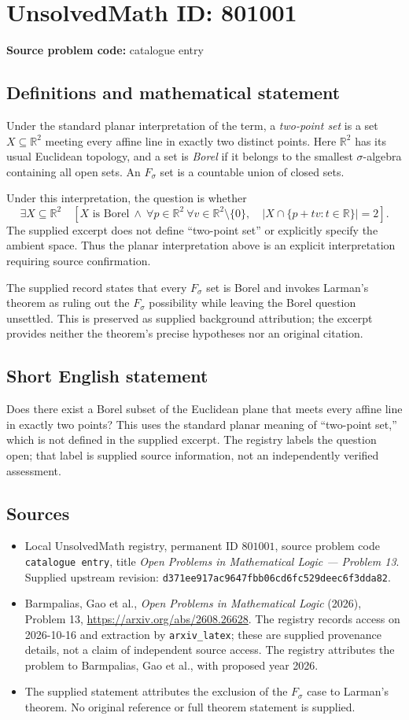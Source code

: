 \documentclass[11pt]{article}
\newcommand{\R}{\mathbb{R}}
\begin{document}
\section*{UnsolvedMath ID: 801001}
\textbf{Source problem code:} catalogue entry
\subsection{Definitions and mathematical statement}
Under the standard planar interpretation of the term, a \emph{two-point set} is a set \(X\subseteq\R^2\) meeting every affine line in exactly two distinct points. Here \(\R^2\) has its usual Euclidean topology, and a set is \emph{Borel} if it belongs to the smallest \(\sigma\)-algebra containing all open sets. An \(F_\sigma\) set is a countable union of closed sets.

Under this interpretation, the question is whether
\[
\exists X\subseteq\R^2\quad\left[X\text{ is Borel}\ \land\ \forall p\in\R^2\ \forall v\in\R^2\setminus\{0\},\quad \left|X\cap\{p+tv:t\in\R\}\right|=2\right].
\]
The supplied excerpt does not define ``two-point set'' or explicitly specify the ambient space. Thus the planar interpretation above is an explicit interpretation requiring source confirmation.

The supplied record states that every \(F_\sigma\) set is Borel and invokes Larman's theorem as ruling out the \(F_\sigma\) possibility while leaving the Borel question unsettled. This is preserved as supplied background attribution; the excerpt provides neither the theorem's precise hypotheses nor an original citation.
\subsection{Short English statement}
Does there exist a Borel subset of the Euclidean plane that meets every affine line in exactly two points? This uses the standard planar meaning of ``two-point set,'' which is not defined in the supplied excerpt. The registry labels the question open; that label is supplied source information, not an independently verified assessment.
\subsection{Sources}
\begin{itemize}
\item Local UnsolvedMath registry, permanent ID \(801001\), source problem code \texttt{catalogue entry}, title \emph{Open Problems in Mathematical Logic --- Problem 13}. Supplied upstream revision: \texttt{d371ee917ac9647fbb06cd6fc529deec6f3dda82}.
\item Barmpalias, Gao et al., \emph{Open Problems in Mathematical Logic} (2026), Problem 13, \url{https://arxiv.org/abs/2608.26628}. The registry records access on 2026-10-16 and extraction by \texttt{arxiv\_latex}; these are supplied provenance details, not a claim of independent source access. The registry attributes the problem to Barmpalias, Gao et al., with proposed year 2026.
\item The supplied statement attributes the exclusion of the \(F_\sigma\) case to Larman's theorem. No original reference or full theorem statement is supplied.
\end{itemize}
\end{document}
